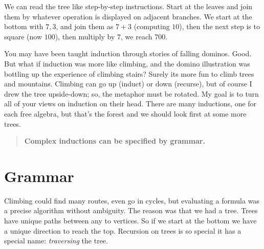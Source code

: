 We can read the tree like step-by-step instructions.  Start at the leaves and join
them by whatever operation is displayed on adjacent branches.
We start at the bottom with $7,3$, and join them as $7+3$ (computing $10$),
then the next step is to square (now $100$), then multiply by $7$, we reach $700$.

You may have been taught induction through stories of falling 
dominos.  Good.  But what if induction was more like climbing, 
and the domino illustration was bottling up the experience
of climbing stairs?  Surely its more fun to climb trees and mountains.
Climbing can go up (induct) or down (recurse), but of course I drew the 
tree upside-down; so, the metaphor must be rotated.
My goal is to turn all of your views on induction on their head.
There are many inductions, one for each free algebra, but that's the forest 
and we should look first at some more trees.

\begin{quote}
    \textbf{Complex inductions can be specified by grammar.}
\end{quote}
\section{Grammar}
Climbing could find many routes, even go in cycles, but 
evaluating a formula was a precise algorithm without ambiguity.
The reason was that we had a tree.  Trees have unique paths between 
any to vertices. So if we start at the bottom we have a unique direction to 
reach the top.  Recursion on trees is so special it has a special name:
\emph{traversing} the tree.  

